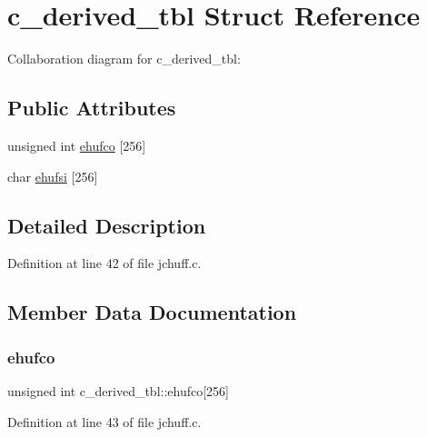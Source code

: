 \hypertarget{structc__derived__tbl}{}\section{c\+\_\+derived\+\_\+tbl Struct Reference}
\label{structc__derived__tbl}


Collaboration diagram for c\+\_\+derived\+\_\+tbl\+:
\subsection*{Public Attributes}
\begin{DoxyCompactItemize}
\item 
unsigned int \mbox{\hyperlink{structc__derived__tbl_acb8d0ecc41a6d9e2d1631122368de665}{ehufco}} \mbox{[}256\mbox{]}
\item 
char \mbox{\hyperlink{structc__derived__tbl_afbf7d9e461bf60c975e26af7404479ee}{ehufsi}} \mbox{[}256\mbox{]}
\end{DoxyCompactItemize}


\subsection{Detailed Description}


Definition at line 42 of file jchuff.\+c.



\subsection{Member Data Documentation}
\mbox{\label{structc__derived__tbl_acb8d0ecc41a6d9e2d1631122368de665}} 
\subsubsection{\texorpdfstring{ehufco}{ehufco}}
{\footnotesize\ttfamily unsigned int c\+\_\+derived\+\_\+tbl\+::ehufco\mbox{[}256\mbox{]}}



Definition at line 43 of file jchuff.\+c.

\mbox{\label{structc__derived__tbl_afbf7d9e461bf60c975e26af7404479ee}} 
